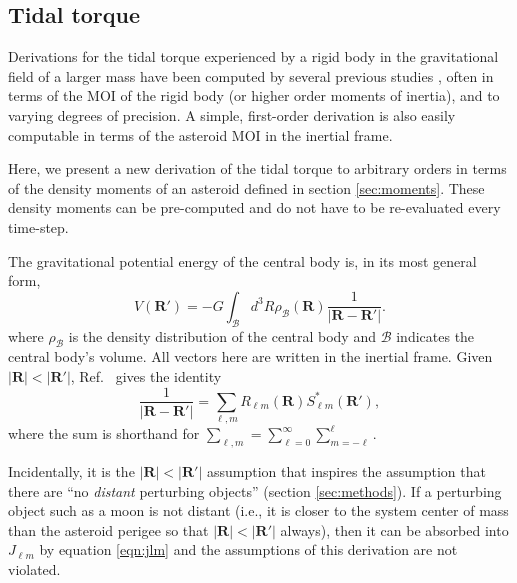 \subsection{Tidal torque}
\label{sec:tidal-torque}

Derivations for the tidal torque experienced by a rigid body in the gravitational field of a larger mass have been computed by several previous studies \cite{paul88,HouMar2017,BOUE2009750, ashenberg07}, often in terms of the MOI of the rigid body (or higher order moments of inertia), and to varying degrees of precision. A simple, first-order derivation is also easily computable in terms of the asteroid MOI in the inertial frame.

Here, we present a new derivation of the tidal torque to arbitrary orders in terms of the density moments of an asteroid defined in section \ref{sec:moments}. These density moments can be pre-computed and do not have to be re-evaluated every time-step.

The gravitational potential energy of the central body is, in its most general form,
\begin{equation}
V(\bm R') = -G\int_\mathcal{B} d^3 R \rho_\mathcal{B}(\bm R) \frac{1}{|\bm{R}-\bm{R'}|}.
\label{eqn:first-pe}
\end{equation}
where $\rho_\mathcal{B}$ is the density distribution of the central body and $\mathcal{B}$ indicates the central body's volume. All vectors here are written in the inertial frame. Given $|\bm{R}| < |\bm{R'}|$, Ref.~\cite{Gelderen1998TheSO} gives the identity
\begin{equation}
  \frac{1}{|\bm R - \bm R'|} = \sum_{\ell, m} R_{\ell m}(\bm R) S_{\ell m}^*(\bm R'),
  \label{eqn:ylm-expansion}
\end{equation}
where the sum is shorthand for $\sum_{\ell, m} = \sum_{\ell = 0}^\infty \sum_{m=-\ell}^\ell$.

Incidentally, it is the $|\bm R| < |\bm R'|$ assumption that inspires the assumption that there are ``no \textit{distant} perturbing objects'' (section \ref{sec:methods}). If a perturbing object such as a moon is not distant (i.e., it is closer to the system center of mass than the asteroid perigee so that $|\bm R| < |\bm R'|$ always), then it can be absorbed into $J_{\ell m}$ by equation \ref{eqn:jlm} and the assumptions of this derivation are not violated.

